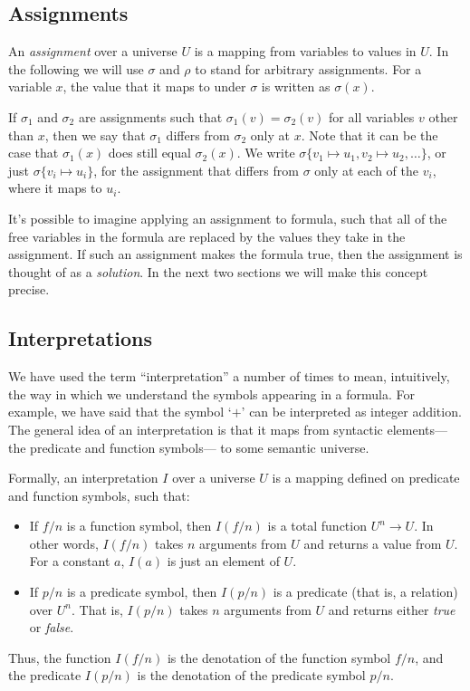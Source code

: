 \subsection{Assignments}
\label{sec:assignments}

An \emph{assignment} over a universe $U$
is a mapping from variables to values in $U$.
In the following
we will use $\sigma$ and $\rho$ to stand for arbitrary assignments.
For a variable $x$,
the value that it maps to under $\sigma$ is written as $\sigma(x)$.

If $\sigma_1$ and $\sigma_2$ are assignments such that
$\sigma_1(v) = \sigma_2(v)$
for all variables $v$ other than $x$,
then we say that $\sigma_1$ differs from $\sigma_2$ only at $x$.
Note that it can be the case that
$\sigma_1(x)$ does still equal $\sigma_2(x)$.
We write $\sigma \{ v_1 \mapsto u_1, v_2 \mapsto u_2, \ldots \}$,
or just $\sigma \{ v_i \mapsto u_i \}$,
for the assignment that differs from $\sigma$ only at each of the $v_i$,
where it maps to $u_i$.

It's possible to imagine applying an assignment to formula,
such that all of the free variables in the formula
are replaced by the values they take in the assignment.
If such an assignment makes the formula true,
then the assignment is thought of as a
\emph{solution\label{gi:solution}}.
In the next two sections we will make this concept precise.


\subsection{Interpretations}
\label{sec:interpretations}

We have used the term ``interpretation'' a number of times to mean,
intuitively, the way in which we understand
the symbols appearing in a formula.
For example,
we have said that the symbol `$+$' can be interpreted as integer addition.
The general idea of an interpretation is that
it maps from syntactic elements---the predicate and function symbols---%
to some semantic universe.

Formally, an interpretation $I$ over a universe $U$
is a mapping defined on predicate and function symbols, such that:
\begin{itemize}
\item
If $f\!/n$ is a function symbol,
then $I(f\!/n)$ is a total function $U^n \rightarrow U$.
In other words,
$I(f\!/n)$ takes $n$ arguments from $U$
and returns a value from $U$.
For a constant $a$,
$I(a)$ is just an element of $U$.
\item
If $p/n$ is a predicate symbol,
then $I(p/n)$ is a predicate (that is, a relation) over $U^n$.
That is,
$I(p/n)$ takes $n$ arguments from $U$
and returns either \textit{true} or \textit{false}.
\end{itemize}
Thus,
the function $I(f\!/n)$
is the denotation of the function symbol $\!f\!/n$,
and the predicate $I(p/n)$
is the denotation of the predicate symbol $p/n$.

